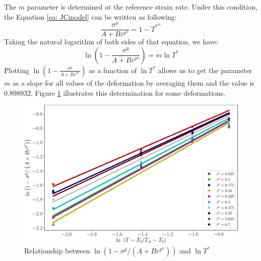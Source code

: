 \documentclass[twoside,english,1p,final,sort&compress]{elsarticle}
\theoremstyle{plain}
\begin{document}
The $m$ parameter is determined at the reference strain rate. Under this condition, the Equation \ref{eq: JCmodel} can be written as following:
\begin{equation}
\frac{\sigma^y}{A + B\varepsilon^{p^n}} = 1 - T^{*^m}
\end{equation}
Taking the natural logarithm of both sides of that equation, we have:
\begin{equation}
\ln\left(1 - \frac{\sigma^y}{A + B\varepsilon^{p^n}}\right)  = m\ln T^*
\end{equation}
Plotting $\ln\left(1 - \frac{\sigma^y}{A + B\varepsilon^{p^n}}\right)$ as a function of $\ln T^*$ allows us to get the parameter $m$ as a slope for all values of the deformation by averaging them and the value is $0.898932$. Figure \ref{fig:JCSigmaT} illustrates this determination for some deformations.
\begin{figure}[!ht]
\centering
\includegraphics[width=0.85\columnwidth]
{newFigures/JCSigmaT}
\caption{Relationship between $\ln\left(1 - \sigma^y/\left(A + B\varepsilon^{p^n}\right)\right)$ and $\ln T^*$}
\label{fig:JCSigmaT}
\end{figure}
\end{document}
